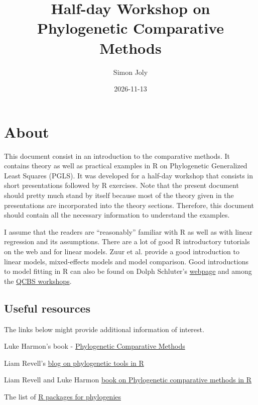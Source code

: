 \documentclass[
]{book}
\title{Half-day Workshop on Phylogenetic Comparative Methods}
\author{Simon Joly}
\date{2026-11-13}
\begin{document}
\maketitle

{
\setcounter{tocdepth}{1}
\tableofcontents
}
\chapter{About}\label{about}

This document consist in an introduction to the comparative methods. It contains theory as well as practical examples in R on Phylogenetic Generalized Least Squares (PGLS). It was developed for a half-day workshop that consists in short presentations followed by R exercises. Note that the present document should pretty much stand by itself because most of the theory given in the presentations are incorporated into the theory sections. Therefore, this document should contain all the necessary information to understand the examples.

I assume that the readers are ``reasonably'' familiar with R as well as with linear regression and its assumptions. There are a lot of good R introductory tutorials on the web and for linear models. Zuur et al. \citep{zuur2007analysing} provide a good introduction to linear models, mixed-effects models and model comparison. Good introductions to model fitting in R can also be found on Dolph Schluter's \href{https://www.zoology.ubc.ca/~schluter/R/fit-model/}{webpage} and among the \href{http://qcbs.ca/wiki/r_workshop4}{QCBS workshops}.

\section{Useful resources}\label{useful-resources}

The links below might provide additional information of interest.

Luke Harmon's book - \href{https://lukejharmon.github.io/pcm/}{Phylogenetic Comparative Methods}

Liam Revell's \href{http://blog.phytools.org/}{blog on phylogenetic tools in R}

Liam Revell and Luke Harmon \href{https://press.princeton.edu/books/ebook/9780691219042/phylogenetic-comparative-methods-in-r}{book on Phylogenetic comparative methods in R}

The list of \href{https://cran.r-project.org/web/views/Phylogenetics.html}{R packages for phylogenies}
\end{document}
